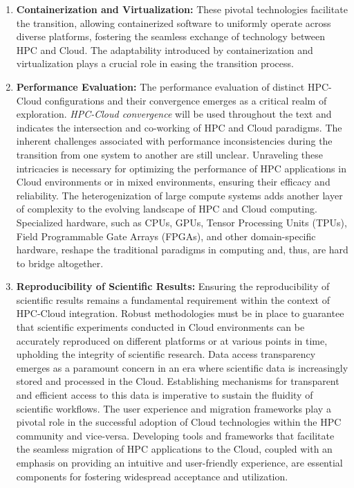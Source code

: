 \noindent
\begin{enumerate}
\item \textbf{Containerization and Virtualization:} These pivotal technologies facilitate the transition, allowing containerized software to uniformly operate across diverse platforms, fostering the seamless exchange of technology between HPC and Cloud. The adaptability introduced by containerization and virtualization plays a crucial role in easing the transition process.
\item \textbf{Performance Evaluation:} The performance evaluation of distinct HPC-Cloud configurations and their convergence emerges as a critical realm of exploration. \textit{HPC-Cloud convergence} will be used throughout the text and indicates the intersection and co-working of HPC and Cloud paradigms. The inherent challenges associated with performance inconsistencies during the transition from one system to another are still unclear. Unraveling these intricacies is necessary for optimizing the performance of HPC applications in Cloud environments or in mixed environments, ensuring their efficacy and reliability. The heterogenization of large compute systems adds another layer of complexity to the evolving landscape of HPC and Cloud computing. Specialized hardware, such as CPUs, GPUs, Tensor Processing Units (TPUs), Field Programmable Gate Arrays (FPGAs), and other domain-specific hardware, reshape the traditional paradigms in computing and, thus, are hard to bridge altogether.

\item \textbf{Reproducibility of Scientific Results:} Ensuring the reproducibility of scientific results remains a fundamental requirement within the context of HPC-Cloud integration. Robust methodologies must be in place to guarantee that scientific experiments conducted in Cloud environments can be accurately reproduced on different platforms or at various points in time, upholding the integrity of scientific research. Data access transparency emerges as a paramount concern in an era where scientific data is increasingly stored and processed in the Cloud. Establishing mechanisms for transparent and efficient access to this data is imperative to sustain the fluidity of scientific workflows. The user experience and migration frameworks play a pivotal role in the successful adoption of Cloud technologies within the HPC community and vice-versa. Developing tools and frameworks that facilitate the seamless migration of HPC applications to the Cloud, coupled with an emphasis on providing an intuitive and user-friendly experience, are essential components for fostering widespread acceptance and utilization.


\end{enumerate}
